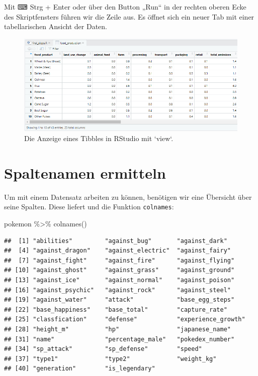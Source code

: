 \documentclass[
]{book}
\newenvironment{Shaded}{\begin{snugshade}}{\end{snugshade}}
\newcommand{\FunctionTok}[1]{\textcolor[rgb]{0.00,0.00,0.00}{#1}}
\newcommand{\NormalTok}[1]{#1}
\newcommand{\SpecialCharTok}[1]{\textcolor[rgb]{0.00,0.00,0.00}{#1}}
\begin{document}
Mit ⌨ Strg + Enter oder über den Button „Run`` in der rechten oberen Ecke des Skriptfensters führen wir die Zeile aus. Es öffnet sich ein neuer Tab mit einer tabellarischen Ansicht der Daten.

\begin{figure}
\includegraphics[width=1\linewidth]{fig/view_result_rstudio} \caption{Die Anzeige eines Tibbles in RStudio mit `view`.}\label{fig:fig-view-rstudio}
\end{figure}

\hypertarget{spaltennamen-ermitteln}{%
\section{Spaltenamen ermitteln}\label{spaltennamen-ermitteln}}

Um mit einem Datensatz arbeiten zu können, benötigen wir eine Übersicht über seine Spalten. Diese liefert und die Funktion \texttt{colnames}:

\begin{Shaded}
\begin{Highlighting}[]
\NormalTok{pokemon }\SpecialCharTok{\%\textgreater{}\%}
  \FunctionTok{colnames}\NormalTok{()}
\end{Highlighting}
\end{Shaded}

\begin{verbatim}
##  [1] "abilities"         "against_bug"       "against_dark"     
##  [4] "against_dragon"    "against_electric"  "against_fairy"    
##  [7] "against_fight"     "against_fire"      "against_flying"   
## [10] "against_ghost"     "against_grass"     "against_ground"   
## [13] "against_ice"       "against_normal"    "against_poison"   
## [16] "against_psychic"   "against_rock"      "against_steel"    
## [19] "against_water"     "attack"            "base_egg_steps"   
## [22] "base_happiness"    "base_total"        "capture_rate"     
## [25] "classfication"     "defense"           "experience_growth"
## [28] "height_m"          "hp"                "japanese_name"    
## [31] "name"              "percentage_male"   "pokedex_number"   
## [34] "sp_attack"         "sp_defense"        "speed"            
## [37] "type1"             "type2"             "weight_kg"        
## [40] "generation"        "is_legendary"
\end{verbatim}
\end{document}
